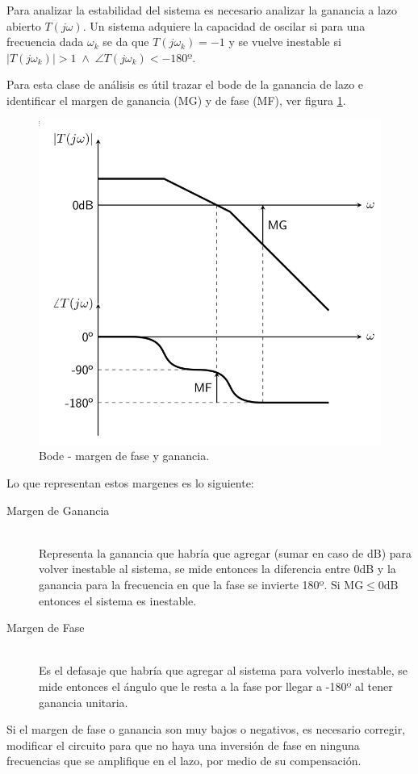 \documentclass[a4paper,12pt,twoside]{article}
\begin{document}
Para analizar la estabilidad del sistema es necesario analizar la ganancia a lazo abierto $T(j\omega)$. Un sistema adquiere la capacidad de oscilar si para una frecuencia dada $\omega_k$ se da que $T(j\omega_k)=-1$ y se vuelve inestable si $\left| T(j\omega_k) \right| > 1 \; \land \; \angle T(j\omega_k) < -180º$.

Para esta clase de análisis es útil trazar el bode de la ganancia de lazo e identificar el margen de ganancia (MG) y de fase (MF), ver figura \ref{fig:margenes}.


\begin{figure}[H]
	\centering
	\includegraphics[height=0.4\textwidth]{img/margenes}
	\caption{Bode - margen de fase y ganancia.}
	\label{fig:margenes}
\end{figure}


Lo que representan estos margenes es lo siguiente:


\begin{description}
	\item[Margen de Ganancia] \hfill \\
		Representa la ganancia que habría que agregar (sumar en caso de dB) para volver inestable al sistema, se mide entonces la diferencia entre 0dB y la ganancia para la frecuencia en que la fase se invierte 180º. Si $\mathrm{MG} \le \mathrm{0dB}$ entonces el sistema es inestable.

	\item[Margen de Fase] \hfill \\
		Es el defasaje que habría que agregar al sistema para volverlo inestable, se mide entonces el ángulo que le resta a la fase por llegar a -180º al tener ganancia unitaria.
\end{description}

Si el margen de fase o ganancia son muy bajos o negativos, es necesario corregir, modificar el circuito para que no haya una inversión de fase en ninguna frecuencias que se amplifique en el lazo, por medio de su compensación.
\end{document}
